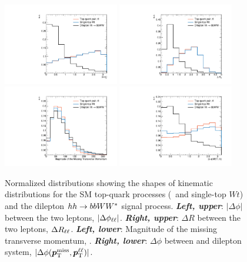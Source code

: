 \begin{figure}[!htb]
    \begin{center}
        \includegraphics[width=0.45\textwidth]{figures/search_hh/signal_pheno/shape_plots/hh_shape_plot_dphi_ll}
        \includegraphics[width=0.45\textwidth]{figures/search_hh/signal_pheno/shape_plots/hh_shape_plot_dRll}
        \includegraphics[width=0.45\textwidth]{figures/search_hh/signal_pheno/shape_plots/hh_shape_plot_met}
        \includegraphics[width=0.45\textwidth]{figures/search_hh/signal_pheno/shape_plots/hh_shape_plot_dphi_met_ll}
        \caption{
            Normalized distributions showing the shapes of kinematic distributions for the SM
            top-quark processes (\ttbar~and single-top $Wt$) and the dilepton $hh \rightarrow bbWW^*$ signal process.
            \textit{\textbf{Left, upper}}: $|\Delta \phi|$ between the two leptons, $|\Delta \phi_{\ell\ell}|$.
            \textit{\textbf{Right, upper}}: $\Delta R$ between the two leptons, $\Delta R_{\ell\ell}$.
            \textit{\textbf{Left, lower}}: Magnitude of the missing transverse momentum, \met.
            \textit{\textbf{Right, lower}}: $\Delta \phi$ between \met and dilepton system, $|\Delta \phi (\bm{p}_{\text{T}}^{\text{miss}}, \bm{p}_{\text{T}}^{\ell\ell})|$.
        }
        \label{fig:hh_kin_1}
    \end{center}
\end{figure}

